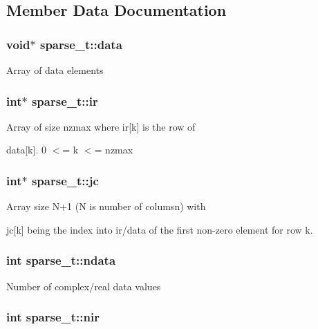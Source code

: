 \subsection{Member Data Documentation}
\hypertarget{structsparse__t_a8194f9468a7d77514db5ed70b54017bb}{
\subsubsection[{data}]{\setlength{\rightskip}{0pt plus 5cm}void$\ast$ sparse\-\_\-t\-::data}}\label{structsparse__t_a8194f9468a7d77514db5ed70b54017bb}
Array of data elements \hypertarget{structsparse__t_ae3b4cd31e90bb824e9b00f7c3dec7af4}{
\subsubsection[{ir}]{\setlength{\rightskip}{0pt plus 5cm}int$\ast$ sparse\-\_\-t\-::ir}}\label{structsparse__t_ae3b4cd31e90bb824e9b00f7c3dec7af4}
\begin{DoxyVerb}                Array of size nzmax where ir[k] is the row of
\end{DoxyVerb}
 data\mbox{[}k\mbox{]}. 0 $<$= k $<$= nzmax \hypertarget{structsparse__t_aeea61c5d15e5cc015a8baf55cc130ee1}{
\subsubsection[{jc}]{\setlength{\rightskip}{0pt plus 5cm}int$\ast$ sparse\-\_\-t\-::jc}}\label{structsparse__t_aeea61c5d15e5cc015a8baf55cc130ee1}
\begin{DoxyVerb}                Array size N+1 (N is number of columsn) with
\end{DoxyVerb}
 jc\mbox{[}k\mbox{]} being the index into ir/data of the first non-\/zero element for row k. \hypertarget{structsparse__t_ab692009004070fda2da8274767a0788d}{
\subsubsection[{ndata}]{\setlength{\rightskip}{0pt plus 5cm}int sparse\-\_\-t\-::ndata}}\label{structsparse__t_ab692009004070fda2da8274767a0788d}
Number of complex/real data values \hypertarget{structsparse__t_a6aa1a08cc2760a36771edd65df8cf111}{
\subsubsection[{nir}]{\setlength{\rightskip}{0pt plus 5cm}int sparse\-\_\-t\-::nir}}\label{structsparse__t_a6aa1a08cc2760a36771edd65df8cf111}
